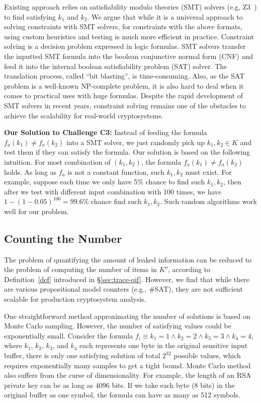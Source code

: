 Existing approach relies on satisfiability modulo theories (SMT) solvers (e.g,
Z3~\cite{DeMoura:2008:ZES:1792734.1792766}) to find satisfying $k_1$ and $k_2$.
We argue that while it is a universal approach to solving constraints with SMT
solvers, for constraints with the above formats, using custom heuristics and
testing is much more efficient in practice. Constraint solving is a decision
problem expressed in logic formulas. SMT solvers transfer the inputted SMT
formula into the boolean conjunctive normal form (CNF) and feed it into the
internal boolean satisfiability problem (SAT) solver. The translation process,
called ``bit blasting'', is time-consuming. Also, as the SAT problem is a
well-known NP-complete problem, it is also hard to deal when it comes to
practical uses with huge formulas. Despite the rapid development of SMT solvers
in recent years, constraint solving remains one of the obstacles to achieve the
scalability for real-world cryptosystems.

\vspace*{2pt}
\textbf{Our Solution to Challenge C3:}
Instead of feeding the formula $f_a(k_1) \neq f_a(k_2)$ into a SMT solver, we
just randomly pick up $k_1, k_2 \in K$ and test them if they can satisfy the
formula. Our solution is based on the following intuition. For most combination
of $(k_{1}, k_{2} )$, the formula $f_a(k_1) \neq f_a(k_2)$ holds. As long as
$f_a$ is not a constant function, such $k_1, k_2$ must exist. For example,
suppose each time we only have 5\% chance to find such $k_1, k_2$, then after we
test with different input combination with 100 times, we have $1 -
(1-0.05)^{100} = 99.6\%$ chance find such $k_1, k_2$. Such random algorithms
work well for our problem.

\subsection{Counting the Number}
\label{MCreasons}
The problem of quantifying the amount of leaked information can be reduced to
the problem of computing the number of items in $K^o$, according to
Definition~\ref{def} introduced in \S\ref{sec:trace-qif}. However, we find that while
there are various propositional model counters (e.g., \#SAT), they are not
sufficient scalable for production cryptosystem analysis.

One straightforward method approximating the number of solutions is based on Monte Carlo
sampling. However, the number of satisfying values could be exponentially small.
Consider the formula $f_i\equiv{k_1} = 1\land{k_2} = 2\land{k_3} = 3\land{k_4} =
4$, where $k_1$, $k_2$, $k_3$, and $k_4$ each represents one byte in the
original sensitive input buffer, there is only one satisfying solution of total
$2^{32}$ possible values, which requires exponentially many samples to get a
tight bound. Monte Carlo method also suffers from the curse of dimensionality.
For example, the length of an RSA private key can be as long as 4096 bits. If we
take each byte (8 bits) in the original buffer as one symbol, the formula can
have as many as 512 symbols.

